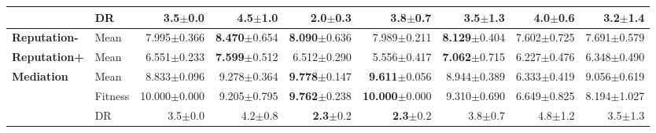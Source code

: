 \begin{table}[htbp]
{\begin{tabular}{ll||r|rrrrrr}
 & DR & 3.5{\scriptsize\color{black!60}$\pm$0.0} & \textcolor{black!60}{4.5}{\scriptsize\color{black!60}$\pm$1.0} & \textbf{2.0}{\scriptsize\color{black!60}$\pm$0.3} & 3.8{\scriptsize\color{black!60}$\pm$0.7} & 3.5{\scriptsize\color{black!60}$\pm$1.3} & 4.0{\scriptsize\color{black!60}$\pm$0.6} & \textbf{3.2}{\scriptsize\color{black!60}$\pm$1.4} \\
\midrule
\textbf{Reputation-} & Mean & \cellcolor[HTML]{FBEFD4} 7.995{\scriptsize\color{black!60}$\pm$0.366} & \textbf{8.470}{\scriptsize\color{black!60}$\pm$0.654} & \textbf{8.090}{\scriptsize\color{black!60}$\pm$0.636} & 7.989{\scriptsize\color{black!60}$\pm$0.211} & \textbf{8.129}{\scriptsize\color{black!60}$\pm$0.404} & 7.602{\scriptsize\color{black!60}$\pm$0.725} & 7.691{\scriptsize\color{black!60}$\pm$0.579} \\
\midrule
\textbf{Reputation+} & Mean & \cellcolor[HTML]{EDF5FA} 6.551{\scriptsize\color{black!60}$\pm$0.233} & \textbf{7.599}{\scriptsize\color{black!60}$\pm$0.512} & 6.512{\scriptsize\color{black!60}$\pm$0.290} & \textcolor{black!60}{5.556}{\scriptsize\color{black!60}$\pm$0.417} & \textbf{7.062}{\scriptsize\color{black!60}$\pm$0.715} & 6.227{\scriptsize\color{black!60}$\pm$0.476} & 6.348{\scriptsize\color{black!60}$\pm$0.490} \\
\midrule
\multirow{3}{*}{\textbf{Mediation}} & Mean & \cellcolor[HTML]{F7E1B0} 8.833{\scriptsize\color{black!60}$\pm$0.096} & 9.278{\scriptsize\color{black!60}$\pm$0.364} & \textbf{9.778}{\scriptsize\color{black!60}$\pm$0.147} & \textbf{9.611}{\scriptsize\color{black!60}$\pm$0.056} & 8.944{\scriptsize\color{black!60}$\pm$0.389} & \textcolor{black!60}{6.333}{\scriptsize\color{black!60}$\pm$0.419} & 9.056{\scriptsize\color{black!60}$\pm$0.619} \\
 & Fitness & \cellcolor[HTML]{F2CF80} 10.000{\scriptsize\color{black!60}$\pm$0.000} & 9.205{\scriptsize\color{black!60}$\pm$0.795} & \textbf{9.762}{\scriptsize\color{black!60}$\pm$0.238} & \textbf{10.000}{\scriptsize\color{black!60}$\pm$0.000} & 9.310{\scriptsize\color{black!60}$\pm$0.690} & \textcolor{black!60}{6.649}{\scriptsize\color{black!60}$\pm$0.825} & \textcolor{black!60}{8.194}{\scriptsize\color{black!60}$\pm$1.027} \\
 & DR & 3.5{\scriptsize\color{black!60}$\pm$0.0} & \textcolor{black!60}{4.2}{\scriptsize\color{black!60}$\pm$0.8} & \textbf{2.3}{\scriptsize\color{black!60}$\pm$0.2} & \textbf{2.3}{\scriptsize\color{black!60}$\pm$0.2} & 3.8{\scriptsize\color{black!60}$\pm$0.7} & \textcolor{black!60}{4.8}{\scriptsize\color{black!60}$\pm$1.2} & 3.5{\scriptsize\color{black!60}$\pm$1.3} \\

\end{tabular}}
\end{table}
